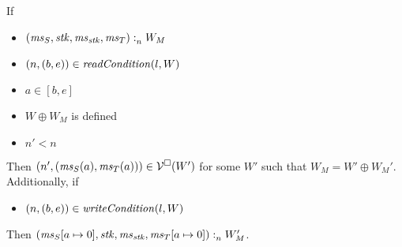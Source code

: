 \documentclass[a4paper]{article}
\begin{document}
\begin{lemma}
  \label{lem:readcond-writecond-work}
  If
  \begin{itemize}
  \item $\memSat{(\ms_S,\stk,\ms_\stk,\ms_T)}{W_M}$
  \item $\npair{(b,e)}\in\readCond{l,W}$
  \item $a \in [b,e]$
  \item $W \oplus W_M$ is defined
  \item $n' < n$
  \end{itemize}
  Then $\npair[n']{(\ms_S(a),\ms_T(a))} \in \lrv(W')$ for some $W'$ such that $W_M = W' \oplus W_M'$.
  Additionally, if
  \begin{itemize}
  \item $\npair{(b,e)}\in\writeCond{l,W}$
  \end{itemize}
  Then $\memSat{(\ms_S[a\mapsto 0],\stk,\ms_\stk,\ms_T[a\mapsto 0])}{W_M'}$.
\end{lemma}
\end{document}
